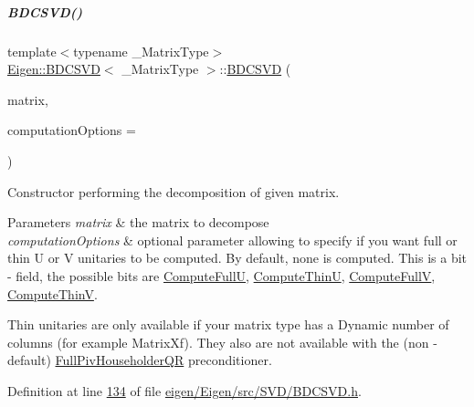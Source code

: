 \mbox{\label{group___s_v_d___module_a302746d9c534cd513c1df87c7ae4850d}} 
\subparagraph{\texorpdfstring{B\+D\+C\+S\+V\+D()}{BDCSVD()}\hspace{0.1cm}{\footnotesize\ttfamily [3/6]}}
{\footnotesize\ttfamily template$<$typename \+\_\+\+Matrix\+Type$>$ \\
\hyperlink{group___s_v_d___module_class_eigen_1_1_b_d_c_s_v_d}{Eigen\+::\+B\+D\+C\+S\+VD}$<$ \+\_\+\+Matrix\+Type $>$\+::\hyperlink{group___s_v_d___module_class_eigen_1_1_b_d_c_s_v_d}{B\+D\+C\+S\+VD} (\begin{DoxyParamCaption}\item[{const Matrix\+Type \&}]{matrix,  }\item[{unsigned int}]{computation\+Options = {} }\end{DoxyParamCaption})\hspace{0.3cm}{\ttfamily [inline]}}



Constructor performing the decomposition of given matrix. 


\begin{DoxyParams}{Parameters}
{\em matrix} & the matrix to decompose \\
\hline
{\em computation\+Options} & optional parameter allowing to specify if you want full or thin U or V unitaries to be computed. By default, none is computed. This is a bit -\/ field, the possible bits are \hyperlink{group__enums_ggae3e239fb70022eb8747994cf5d68b4a9a2b4f91ca5859a4159dbfe8090043817f}{Compute\+FullU}, \hyperlink{group__enums_ggae3e239fb70022eb8747994cf5d68b4a9af8c742a1aa87773e165eae406c9ccaf8}{Compute\+ThinU}, \hyperlink{group__enums_ggae3e239fb70022eb8747994cf5d68b4a9a52c6f7e80bbf9a42297c88f700245b51}{Compute\+FullV}, \hyperlink{group__enums_ggae3e239fb70022eb8747994cf5d68b4a9a1055e53fa95c8ae04a07ebb72cfafd95}{Compute\+ThinV}.\\
\hline
\end{DoxyParams}
Thin unitaries are only available if your matrix type has a Dynamic number of columns (for example Matrix\+Xf). They also are not available with the (non -\/ default) \hyperlink{group___q_r___module_class_eigen_1_1_full_piv_householder_q_r}{Full\+Piv\+Householder\+QR} preconditioner. 

Definition at line \hyperlink{eigen_2_eigen_2src_2_s_v_d_2_b_d_c_s_v_d_8h_source_l00134}{134} of file \hyperlink{eigen_2_eigen_2src_2_s_v_d_2_b_d_c_s_v_d_8h_source}{eigen/\+Eigen/src/\+S\+V\+D/\+B\+D\+C\+S\+V\+D.\+h}.

